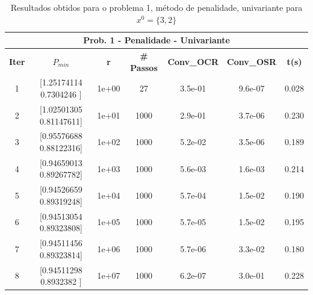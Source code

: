 \documentclass[10pt, a4paper]{article}
\begin{document}
\vspace{5mm}
\begin{table}[H]
  \begin{center}
    \begin{tabular}{c|c|c|c|c|c|c}
      \multicolumn{7}{c}{\textbf{Prob. 1 - Penalidade - Univariante}}\\
      \hline
      \textbf{Iter} & \textbf{$P_{min}$} & \textbf{r} & \textbf{\# Passos} & \textbf{Conv\_OCR} & \textbf{Conv\_OSR} & \textbf{t(s)}\\
      \hline
        1& [1.25174114 0.7304246 ]& 1e+00& 27& 3.5e-01& 9.6e-07& 0.028   \\
        2& [1.02501305 0.81147611]& 1e+01& 1000& 2.9e-01& 3.7e-06& 0.230\\
        3& [0.95576688 0.88122316]& 1e+02& 1000& 5.2e-02& 3.5e-06& 0.189\\
        4& [0.94659013 0.89267782]& 1e+03& 1000& 5.6e-03& 1.6e-03& 0.214\\
        5& [0.94526659 0.89319248]& 1e+04& 1000& 5.7e-04& 1.5e-02& 0.190\\
        6& [0.94513054 0.89323808]& 1e+05& 1000& 5.7e-05& 1.5e-02& 0.195\\
        7& [0.94511456 0.89323814]& 1e+06& 1000& 5.7e-06& 3.3e-02& 0.180\\
        8& [0.94511298 0.8932382 ]& 1e+07& 1000& 6.2e-07& 3.0e-01& 0.228\\
    \end{tabular}
  \end{center}
  \caption{Resultados obtidos para o problema 1, método de penalidade, univariante para $x^0=\{3,2\}$}
\end{table}
\end{document}

